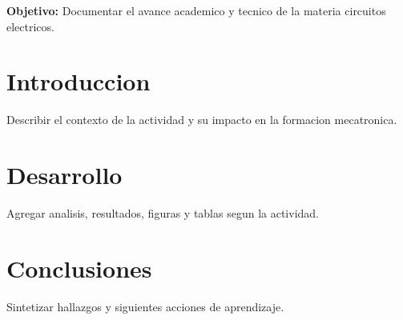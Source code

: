 \documentclass[spanish,letterpaper,oneside]{article}
\begin{document}
\templatePortrait
\templatePagecfg
\onehalfspacing

\begin{abstractd}
\textbf{Objetivo:} Documentar el avance academico y tecnico de la materia circuitos electricos.
\end{abstractd}

\templateIndex
\templateFinalcfg

\section{Introduccion}
Describir el contexto de la actividad y su impacto en la formacion mecatronica.

\section{Desarrollo}
Agregar analisis, resultados, figuras y tablas segun la actividad.

\section{Conclusiones}
Sintetizar hallazgos y siguientes acciones de aprendizaje.



\end{document}
